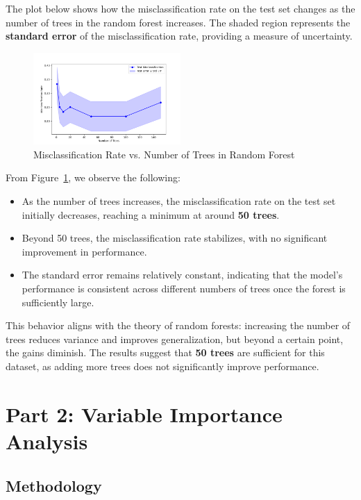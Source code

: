 \documentclass[fleqn,moreauthors,10pt]{ds_report}
\begin{document}
The plot below shows how the misclassification rate on the test set changes as the number of trees in the random forest increases. The shaded region represents the \textbf{standard error} of the misclassification rate, providing a measure of uncertainty.
\begin{figure}[h!]
    \centering
    \includegraphics[width=0.5\textwidth]{fig/misclassification_vs_trees}
    \caption{Misclassification Rate vs. Number of Trees in Random Forest}
    \label{fig:misclassification_plot}
\end{figure}
From Figure~\ref{fig:misclassification_plot}, we observe the following:
\begin{itemize}
    \item As the number of trees increases, the misclassification rate on the test set initially decreases, reaching a minimum at around \textbf{50 trees}.
    \item Beyond 50 trees, the misclassification rate stabilizes, with no significant improvement in performance.
    \item The standard error remains relatively constant, indicating that the model's performance is consistent across different numbers of trees once the forest is sufficiently large.
\end{itemize}

This behavior aligns with the theory of random forests: increasing the number of trees reduces variance and improves generalization, but beyond a certain point, the gains diminish. The results suggest that \textbf{50 trees} are sufficient for this dataset, as adding more trees does not significantly improve performance.


\section*{Part 2: Variable Importance Analysis}

\subsection*{Methodology}
\end{document}
